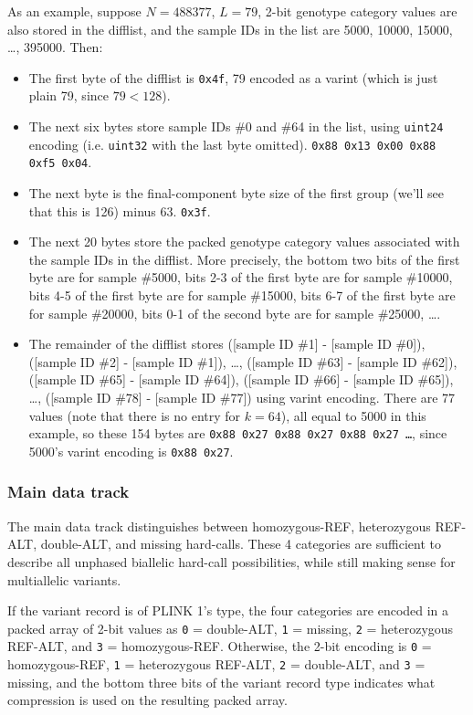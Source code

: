 \documentclass[8pt]{article}
\begin{document}
As an example, suppose $N=488377$, $L=79$, 2-bit genotype category values are
also stored in the difflist, and the sample IDs in the list are 5000, 10000,
15000, \ldots , 395000.  Then:

\begin{itemize}
\item The first byte of the difflist is \texttt{0x4f}, 79 encoded as a
  varint (which is just plain 79, since $79<128$).
\item The next six bytes store sample IDs \#0 and \#64 in the list, using
  \texttt{uint24} encoding (i.e. \texttt{uint32} with the last byte omitted).
  \texttt{0x88 0x13 0x00 0x88 0xf5 0x04}.
\item The next byte is the final-component byte size of the first group (we'll
  see that this is 126) minus 63.  \texttt{0x3f}.
\item The next 20 bytes store the packed genotype category values associated
  with the sample IDs in the difflist.  More precisely, the bottom two bits of
  the first byte are for sample \#5000, bits 2-3 of the first byte are for
  sample \#10000, bits 4-5 of the first byte are for sample \#15000, bits 6-7
  of the first byte are for sample \#20000, bits 0-1 of the second byte are for
  sample \#25000, \ldots .
\item The remainder of the difflist stores ([sample ID \#1] - [sample ID \#0]),
  ([sample ID \#2] - [sample ID \#1]), \ldots , ([sample ID \#63] - [sample ID
  \#62]), ([sample ID \#65] - [sample ID \#64]), ([sample ID \#66] - [sample ID
  \#65]), \ldots , ([sample ID \#78] - [sample ID \#77]) using varint encoding.
  There are 77 values (note that there is no entry for $k=64$), all equal to
  5000 in this example, so these 154 bytes are \texttt{0x88 0x27 0x88 0x27 0x88
  0x27 \ldots}, since 5000's varint encoding is \texttt{0x88 0x27}.
\end{itemize}

\subsubsection{Main data track}

The main data track distinguishes between homozygous-REF, heterozygous REF-ALT,
double-ALT, and missing hard-calls.  These 4 categories are sufficient to
describe all unphased biallelic hard-call possibilities, while still making
sense for multiallelic variants.

If the variant record is of PLINK 1's type, the four categories are encoded in
a packed array of 2-bit values as \texttt{0} = double-ALT, \texttt{1} =
missing, \texttt{2} = heterozygous REF-ALT, and \texttt{3} = homozygous-REF.
Otherwise, the 2-bit encoding is \texttt{0} = homozygous-REF, \texttt{1} =
heterozygous REF-ALT, \texttt{2} = double-ALT, and \texttt{3} = missing, and
the bottom three bits of the variant record type indicates what compression is
used on the resulting packed array.
\end{document}
